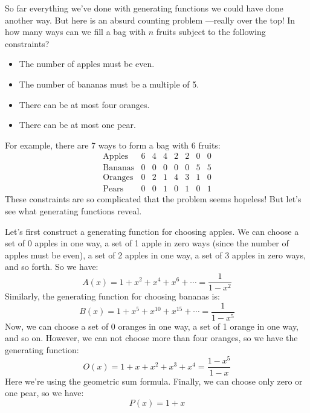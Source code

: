 So far everything we've done with generating functions we could have
done another way.  But here is an absurd counting problem ---really
over the top!  In how many ways can we fill a bag with $n$ fruits
subject to the following constraints?

\begin{itemize}
\item The number of apples must be even.
\item The number of bananas must be a multiple of 5.
\item There can be at most four oranges.
\item There can be at most one pear.
\end{itemize}

For example, there are 7 ways to form a bag with 6 fruits:
%
\[
\begin{array}{c|ccccccc}
\text{Apples}  & 6 & 4 & 4 & 2 & 2 & 0 & 0 \\
\text{Bananas} & 0 & 0 & 0 & 0 & 0 & 5 & 5 \\
\text{Oranges} & 0 & 2 & 1 & 4 & 3 & 1 & 0 \\
\text{Pears}   & 0 & 0 & 1 & 0 & 1 & 0 & 1
\end{array}
\]
%
These constraints are so complicated that the problem seems hopeless!
But let's see what generating functions reveal.

Let's first construct a generating function for choosing apples.  We
can choose a set of 0 apples in one way, a set of 1 apple in zero
ways (since the number of apples must be even), a set of 2 apples in
one way, a set of 3 apples in zero ways, and so forth.  So we have:
%
\[
A(x) = 1 + x^2 + x^4 + x^6 + \cdots = \frac{1}{1 - x^2}
\]
%
Similarly, the generating function for choosing bananas is:
%
\[
B(x) = 1 + x^5 + x^{10} + x^{15} + \cdots = \frac{1}{1 - x^5}
\]
Now, we can choose a set of 0 oranges in one way, a set of 1 orange in
one way, and so on.  However, we can not choose more than four
oranges, so we have the generating function:
%
\[
O(x) = 1 + x + x^2 + x^3 + x^4 = \frac{1-x^5}{1-x}
\]
%
Here we're using the geometric sum formula.  Finally, we can choose
only zero or one pear, so we have:
%
\[
P(x) = 1 + x
\]

